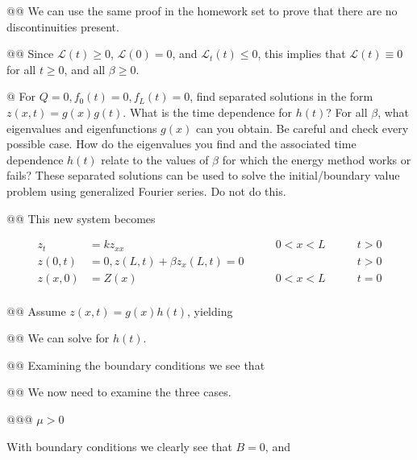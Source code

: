 \documentclass[10pt]{article}
\begin{document}
\begin{easylist}[enumerate]
    @@ We can use the same proof in the homework set to prove that there are no discontinuities present.

    @@ Since $\mathcal{L}(t) \ge 0$, $\mathcal{L}(0) = 0$, and $\mathcal{L}_t(t) \le 0$, this implies that
    $\mathcal{L}(t) \equiv 0$ for all $t \ge 0$, and all $\beta \ge 0$.

    @ For $Q=0, f_0(t)=0,f_L(t)=0$, find separated solutions in the form $z(x, t) = g(x)g(t)$. What is the time
    dependence for $h(t)$? For all $\beta$, what eigenvalues and eigenfunctions $g(x)$ can you obtain. Be careful and
    check every possible case. How do the eigenvalues you find and the associated time dependence $h(t)$ relate to the
    values of $\beta$ for which the energy method works or fails? These separated solutions can be used to solve the
    initial/boundary value problem using generalized Fourier series. Do not do this.

    @@ This new system becomes

    \begin{align*}
        z_t &= k z_{xx} \qquad & 0 < x < L \qquad & t > 0\\
        z(0, t) &= 0, z(L, t) + \beta z_x(L, t) = 0 \qquad && t > 0\\
        z(x, 0) &= Z(x) \qquad & 0 < x < L \qquad & t = 0\\
    \end{align*}

    @@ Assume $z(x, t) = g(x)h(t)$, yielding


    @@ We can solve for $h(t)$.


    @@ Examining the boundary conditions we see that


    @@ We now need to examine the three cases.

    @@@ $\mu > 0$


    With boundary conditions we clearly see that $B = 0$, and


\end{easylist}
\end{document}
